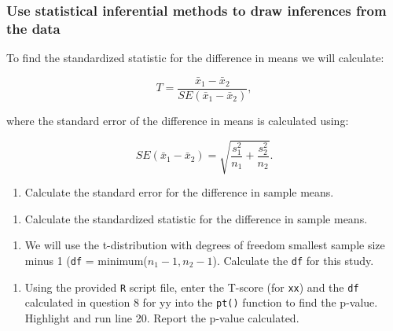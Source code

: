 \documentclass[
]{report}
\providecommand{\tightlist}{%
  \setlength{\itemsep}{0pt}\setlength{\parskip}{0pt}}
\begin{document}
\hypertarget{use-statistical-inferential-methods-to-draw-inferences-from-the-data-4}{%
\subsubsection*{Use statistical inferential methods to draw inferences from the data}\label{use-statistical-inferential-methods-to-draw-inferences-from-the-data-4}}

To find the standardized statistic for the difference in means we will calculate:

\[T = \frac{\bar{x}_1-\bar{x}_2}{SE(\bar{x}_1-\bar{x}_2)},\]

where the standard error of the difference in means is calculated using:

\[SE(\bar{x}_1 -\bar{x}_2)=\sqrt{\frac{s_1^2}{n_1}+\frac{s_2^2}{n_2}}.\]

\begin{enumerate}
\def\labelenumi{\arabic{enumi}.}
\setcounter{enumi}{5}
\tightlist
\item
  Calculate the standard error for the difference in sample means.
\end{enumerate}

\vspace{0.5in}
\newpage

\begin{enumerate}
\def\labelenumi{\arabic{enumi}.}
\setcounter{enumi}{6}
\tightlist
\item
  Calculate the standardized statistic for the difference in sample means.
\end{enumerate}

\vspace{0.5in}

\begin{enumerate}
\def\labelenumi{\arabic{enumi}.}
\setcounter{enumi}{7}
\tightlist
\item
  We will use the t-distribution with degrees of freedom smallest sample size minus 1 (\texttt{df} = minimum(\(n_1 - 1, n_2 - 1\)). Calculate the \texttt{df} for this study.
\end{enumerate}

\vspace{0.2in}

\begin{enumerate}
\def\labelenumi{\arabic{enumi}.}
\setcounter{enumi}{8}
\tightlist
\item
  Using the provided \texttt{R} script file, enter the T-score (for \texttt{xx}) and the \texttt{df} calculated in question 8 for yy into the \texttt{pt()} function to find the p-value. Highlight and run line 20. Report the p-value calculated.
\end{enumerate}
\end{document}
